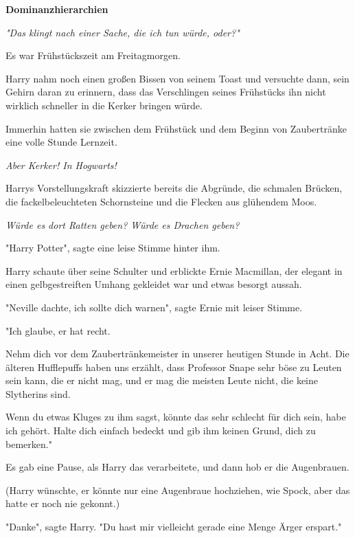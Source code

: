 

\hypertarget{dominanzhierarchien}{%

\textbf{Dominanzhierarchien}

\emph{"Das klingt nach einer Sache, die ich tun würde, oder?"}

Es war Frühstückszeit am Freitagmorgen.

Harry nahm noch einen großen Bissen von seinem Toast und versuchte dann, sein Gehirn daran zu erinnern, dass das Verschlingen seines Frühstücks ihn nicht wirklich schneller in die Kerker bringen würde.

Immerhin hatten sie zwischen dem Frühstück und dem Beginn von Zaubertränke eine volle Stunde Lernzeit.

\emph{Aber Kerker! In Hogwarts!}

Harrys Vorstellungskraft skizzierte bereits die Abgründe, die schmalen Brücken, die fackelbeleuchteten Schornsteine und die Flecken aus glühendem Moos.

\emph{Würde es dort Ratten geben? Würde es Drachen geben?}

"Harry Potter", sagte eine leise Stimme hinter ihm.

Harry schaute über seine Schulter und erblickte Ernie Macmillan, der elegant in einen gelbgestreiften Umhang gekleidet war und etwas besorgt aussah.

"Neville dachte, ich sollte dich warnen", sagte Ernie mit leiser Stimme.

"Ich glaube, er hat recht.

Nehm dich vor dem Zaubertränkemeister in unserer heutigen Stunde in Acht. Die älteren Hufflepuffs haben uns erzählt, dass Professor Snape sehr böse zu Leuten sein kann, die er nicht mag, und er mag die meisten Leute nicht, die keine Slytherins sind.

Wenn du etwas Kluges zu ihm sagst, könnte das sehr schlecht für dich sein, habe ich gehört. Halte dich einfach bedeckt und gib ihm keinen Grund, dich zu bemerken."

Es gab eine Pause, als Harry das verarbeitete, und dann hob er die Augenbrauen.

(Harry wünschte, er könnte nur eine Augenbraue hochziehen, wie Spock, aber das hatte er noch nie gekonnt.)

"Danke", sagte Harry. "Du hast mir vielleicht gerade eine Menge Ärger erspart."

}
